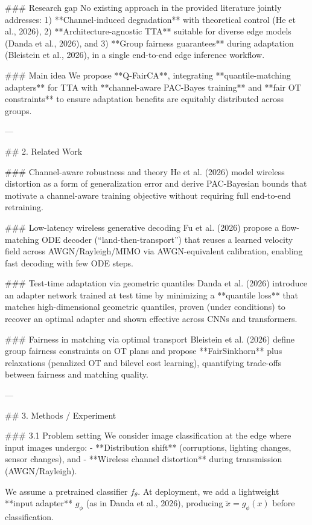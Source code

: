 ### Research gap  
No existing approach in the provided literature jointly addresses:  
1) **Channel-induced degradation** with theoretical control (He et al., 2026),  
2) **Architecture-agnostic TTA** suitable for diverse edge models (Danda et al., 2026), and  
3) **Group fairness guarantees** during adaptation (Bleistein et al., 2026),  
in a single end-to-end edge inference workflow.

### Main idea  
We propose **Q-FairCA**, integrating **quantile-matching adapters** for TTA with **channel-aware PAC-Bayes training** and **fair OT constraints** to ensure adaptation benefits are equitably distributed across groups.

---

## 2. Related Work  

### Channel-aware robustness and theory  
He et al. (2026) model wireless distortion as a form of generalization error and derive PAC-Bayesian bounds that motivate a channel-aware training objective without requiring full end-to-end retraining.

### Low-latency wireless generative decoding  
Fu et al. (2026) propose a flow-matching ODE decoder (“land-then-transport”) that reuses a learned velocity field across AWGN/Rayleigh/MIMO via AWGN-equivalent calibration, enabling fast decoding with few ODE steps.

### Test-time adaptation via geometric quantiles  
Danda et al. (2026) introduce an adapter network trained at test time by minimizing a **quantile loss** that matches high-dimensional geometric quantiles, proven (under conditions) to recover an optimal adapter and shown effective across CNNs and transformers.

### Fairness in matching via optimal transport  
Bleistein et al. (2026) define group fairness constraints on OT plans and propose **FairSinkhorn** plus relaxations (penalized OT and bilevel cost learning), quantifying trade-offs between fairness and matching quality.

---

## 3. Methods / Experiment  

### 3.1 Problem setting  
We consider image classification at the edge where input images undergo:  
- **Distribution shift** (corruptions, lighting changes, sensor changes), and  
- **Wireless channel distortion** during transmission (AWGN/Rayleigh).  

We assume a pretrained classifier \(f_\theta\). At deployment, we add a lightweight **input adapter** \(g_\phi\) (as in Danda et al., 2026), producing \(\tilde{x}=g_\phi(x)\) before classification.

